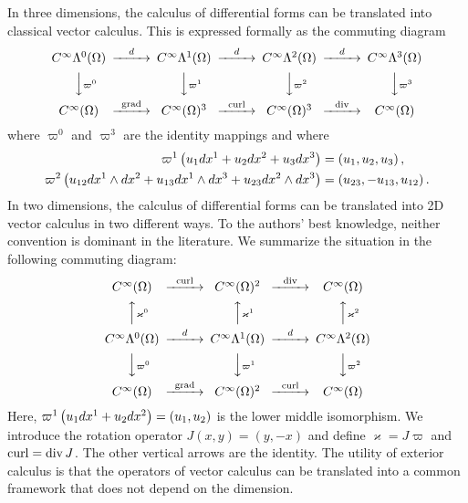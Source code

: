 \documentclass[12pt,a4paper]{article}
\begin{document}
\begin{remark}
    In three dimensions, 
    the calculus of differential forms can be translated into classical vector calculus. 
    This is expressed formally as the commuting diagram 
    \[
    \begin{CD}
        C^\infty\Alt^0(\Omega) @>{\cartan}>> C^\infty\Alt^1(\Omega) @>{\cartan}>> C^\infty\Alt^2(\Omega) @>{\cartan}>> C^\infty\Alt^3(\Omega) 
        \\
        @VV{\varpi^{0}}V 
        @VV{\varpi^{1}}V 
        @VV{\varpi^{2}}V 
        @VV{\varpi^{3}}V 
        \\
        C^\infty(\Omega) @>{\grad}>> C^\infty(\Omega)^{3} @>{\curl}>> C^\infty(\Omega)^{3} @>{\divergence}>> C^\infty(\Omega)
    \end{CD}
    \]
    where $\varpi^{0}$ and $\varpi^{3}$ are the identity mappings and where 
    \begin{align*}
     \varpi^{1}\left( u_1 dx^{1} + u_2 dx^{2} + u_3 dx^{3} \right) 
     &= 
     \left( u_1, u_2, u_3 \right), 
     \\
     \varpi^{2}\left( u_{12} dx^{1} \wedge dx^{2} + u_{13} dx^{1} \wedge dx^{3} + u_{23} dx^{2} \wedge dx^{3} \right) 
     &= 
     \left( u_{23}, - u_{13}, u_{12} \right).   
    \end{align*}
    In two dimensions, 
    the calculus of differential forms can be translated into 2D vector calculus in two different ways. 
    To the authors' best knowledge, neither convention is dominant in the literature.
    We summarize the situation in the following commuting diagram: 
    \[ %
    \begin{CD}
        C^\infty(\Omega) @>{\curl}>> C^\infty(\Omega)^{2} @>{\divergence}>> C^\infty(\Omega)
        \\
        @AA{\varkappa^{0}}A 
        @AA{\varkappa^{1}}A 
        @AA{\varkappa^{2}}A 
        \\
        C^\infty\Alt^0(\Omega) @>{\cartan}>> C^\infty\Alt^1(\Omega) @>{\cartan}>> C^\infty\Alt^2(\Omega) 
        \\
        @VV{\varpi^{0}}V 
        @VV{\varpi^{1}}V 
        @VV{\varpi^{2}}V 
        \\
        C^\infty(\Omega) @>{\grad}>> C^\infty(\Omega)^{2} @>{\rot}>> C^\infty(\Omega)
    \end{CD}
    \]
    Here, $\varpi^{1}\left( u_1 dx^{1} + u_2 dx^{2} \right) = \left( u_1, u_2 \right)$ is the lower middle isomorphism. We introduce the rotation operator $J(x,y) = (y,-x)$ and define $\varkappa = J \varpi$ and $\operatorname{curl} = \operatorname{div} J$.
    The other vertical arrows are the identity. 
    The utility of exterior calculus is that the operators of vector calculus can be translated into a common framework that does not depend on the dimension.
\end{remark}
\end{document}
